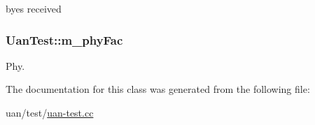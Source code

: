 byes received 

\subsubsection[{\texorpdfstring{m\+\_\+phy\+Fac}{m_phyFac}}]{ Uan\+Test\+::m\+\_\+phy\+Fac\hspace{0.3cm}{\ttfamily [private]}}\hypertarget{classUanTest_aa3af462909130b54c4b43b5bca42446b}{}\label{classUanTest_aa3af462909130b54c4b43b5bca42446b}


Phy. 



The documentation for this class was generated from the following file\+:\begin{DoxyCompactItemize}
\item 
uan/test/\hyperlink{uan-test_8cc}{uan-\/test.\+cc}\end{DoxyCompactItemize}
